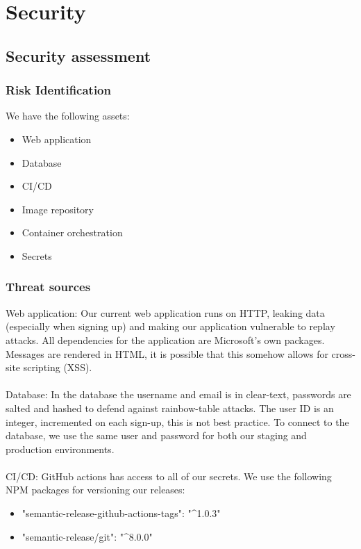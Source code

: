 \section{Security}
\subsection{Security assessment}
\subsubsection{Risk Identification}

We have the following assets:
\begin{itemize}
    \item Web application
    \item Database
    \item CI/CD
    \item Image repository
    \item Container orchestration
    \item Secrets
\end{itemize}

\subsubsection{Threat sources}

Web application: Our current web application runs on HTTP, leaking data (especially when signing up) and making our application vulnerable to replay attacks. 
All dependencies for the application are Microsoft's own packages.
Messages are rendered in HTML, it is possible that this somehow allows for cross-site scripting (XSS).\\\\
Database: In the database the username and email is in clear-text, passwords are salted and hashed to defend against rainbow-table attacks.
The user ID is an integer, incremented on each sign-up, this is not best practice.
To connect to the database, we use the same user and password for both our staging and production environments.\\\\
CI/CD: GitHub actions has access to all of our secrets.
We use the following NPM packages for versioning our releases:
\begin{itemize}
    \item "semantic-release-github-actions-tags": "\textasciicircum1.0.3"
    \item "semantic-release/git": "\textasciicircum8.0.0"
\end{itemize}

